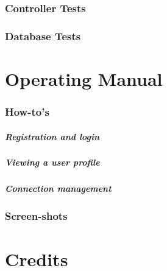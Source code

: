 \documentclass[12pt]{report}
\begin{document}
\subsection{Controller Tests}
\subsection{Database Tests}


\chapter{Operating Manual}
\subsection{How-to's}
\paragraph{Registration and login}
\paragraph{Viewing a user profile}
\paragraph{Connection management}

\subsection{Screen-shots}

\chapter{Credits}
\end{document}
